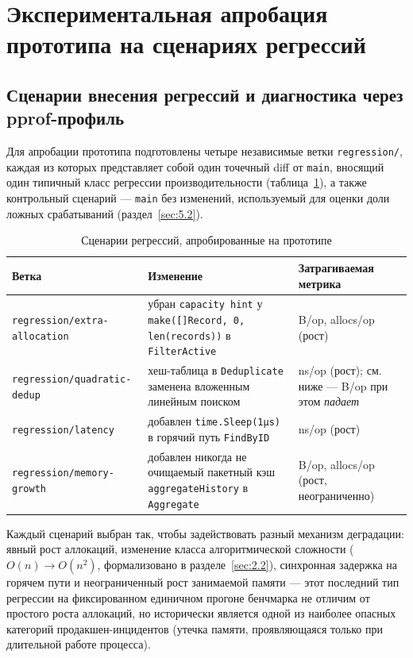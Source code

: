 \section{Экспериментальная апробация прототипа на сценариях регрессий}
\label{sec:razdel5}

\subsection{Сценарии внесения регрессий и диагностика через pprof-профиль}
\label{sec:5.1}

Для апробации прототипа подготовлены четыре независимые ветки
\texttt{regression/\allowbreak *}, каждая из которых представляет собой один точечный
diff от \texttt{main}, вносящий один типичный класс регрессии
производительности (таблица~\ref{tab:5.1}), а также контрольный сценарий —
\texttt{main} без изменений, используемый для оценки доли ложных
срабатываний (раздел~\ref{sec:5.2}).

\begin{table}[htbp]
\caption{Сценарии регрессий, апробированные на прототипе}
\label{tab:5.1}
\centering
\begin{tabular}{p{3.4cm}p{5.5cm}p{4.8cm}}
\toprule
Ветка & Изменение & Затрагиваемая метрика \\
\midrule
\texttt{regression/\allowbreak extra-\allowbreak allocation} & убран \texttt{capacity hint} у \texttt{make([]Record, 0, len(records))} в \texttt{FilterActive} & B/op, allocs/op (рост) \\
\texttt{regression/\allowbreak quadratic-\allowbreak dedup} & хеш-таблица в \texttt{Deduplicate} заменена вложенным линейным поиском & ns/op (рост); см. ниже — B/op при этом \emph{падает} \\
\texttt{regression/\allowbreak latency} & добавлен \texttt{time.Sleep(1μs)} в горячий путь \texttt{FindByID} & ns/op (рост) \\
\texttt{regression/\allowbreak memory-\allowbreak growth} & добавлен никогда не очищаемый пакетный кэш \texttt{aggregateHistory} в \texttt{Aggregate} & B/op, allocs/op (рост, неограниченно) \\
\bottomrule
\end{tabular}
\end{table}

Каждый сценарий выбран так, чтобы задействовать разный механизм деградации:
явный рост аллокаций, изменение класса алгоритмической сложности
($O(n) \to O(n^2)$, формализовано в разделе~\ref{sec:2.2}), синхронная
задержка на горячем пути и неограниченный рост занимаемой памяти — этот
последний тип регрессии на фиксированном единичном прогоне бенчмарка не
отличим от простого роста аллокаций, но исторически является одной из
наиболее опасных категорий продакшен-инцидентов (утечка памяти,
проявляющаяся только при длительной работе процесса).

